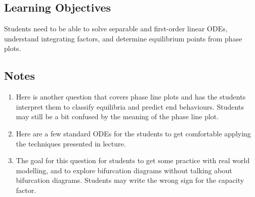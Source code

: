 \subsection*{Learning Objectives}
Students need to be able to solve separable and first-order linear ODEs, understand integrating factors, and determine equilibrium points from phase plots.


\subsection*{Notes}
\begin{enumerate}
    \item Here is another question that covers phase line plots and has the students interpret them to classify equilibria and predict end behaviours. Students may still be a bit confused by the meaning of the phase line plot.
    
    \item Here are a few standard ODEs for the students to get comfortable applying the techniques presented in lecture.

    \item The goal for this question for students to get some practice with real world modelling, and to explore bifurcation diagrams without talking about bifurcation diagrams. Students may write the wrong sign for the capacity factor. 
\end{enumerate}

